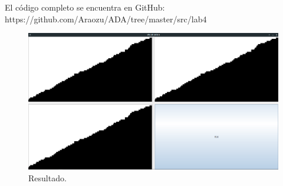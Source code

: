 \documentclass[paper=a4, fontsize=11pt]{scrartcl} %
\numberwithin{equation}{section} %
\numberwithin{figure}{section} %
\numberwithin{table}{section} %
\begin{document}
El código completo se encuentra en GitHub: https://github.com/Araozu/ADA/tree/master/src/lab4

\begin{figure}
    \includegraphics[width=\linewidth]{Resultado.png}
    \caption{Resultado.}
\end{figure}


\end{document}
